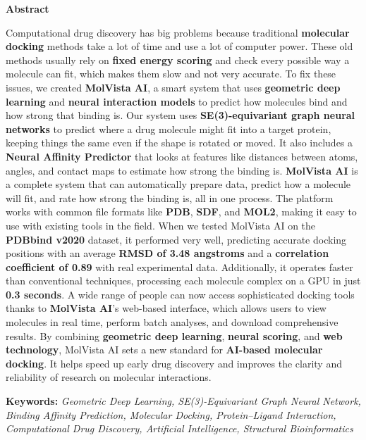 \begin{center}
\bfseries \fontsize{24}{12} \selectfont Abstract
\end{center}
\vspace*{1\baselineskip}

\noindent Computational drug discovery has big problems because traditional \textbf{molecular docking} methods take a lot of time and use a lot of computer power. These old methods usually rely on \textbf{fixed energy scoring} and check every possible way a molecule can fit, which makes them slow and not very accurate. To fix these issues, we created \textbf{MolVista AI}, a smart system that uses \textbf{geometric deep learning} and \textbf{neural interaction models} to predict how molecules bind and how strong that binding is. Our system uses \textbf{SE(3)-equivariant graph neural networks} to predict where a drug molecule might fit into a target protein, keeping things the same even if the shape is rotated or moved. It also includes a \textbf{Neural Affinity Predictor} that looks at features like distances between atoms, angles, and contact maps to estimate how strong the binding is. \textbf{MolVista AI} is a complete system that can automatically prepare data, predict how a molecule will fit, and rate how strong the binding is, all in one process. The platform works with common file formats like \textbf{PDB}, \textbf{SDF}, and \textbf{MOL2}, making it easy to use with existing tools in the field. When we tested MolVista AI on the \textbf{PDBbind v2020} dataset, it performed very well, predicting accurate docking positions with an average \textbf{RMSD of 3.48 angstroms} and a \textbf{correlation coefficient of 0.89} with real experimental data. Additionally, it operates faster than conventional techniques, processing each molecule complex on a GPU in just \textbf{0.3 seconds}. A wide range of people can now access sophisticated docking tools thanks to \textbf{MolVista AI}'s web-based interface, which allows users to view molecules in real time, perform batch analyses, and download comprehensive results. By combining \textbf{geometric deep learning}, \textbf{neural scoring}, and \textbf{web technology}, MolVista AI sets a new standard for \textbf{AI-based molecular docking}. It helps speed up early drug discovery and improves the clarity and reliability of research on molecular interactions.

\vspace{\baselineskip}
\noindent \textbf{Keywords: } \textit{Geometric Deep Learning, SE(3)-Equivariant Graph Neural Network, Binding Affinity Prediction, Molecular Docking, Protein–Ligand Interaction, Computational Drug Discovery, Artificial Intelligence, Structural Bioinformatics}
